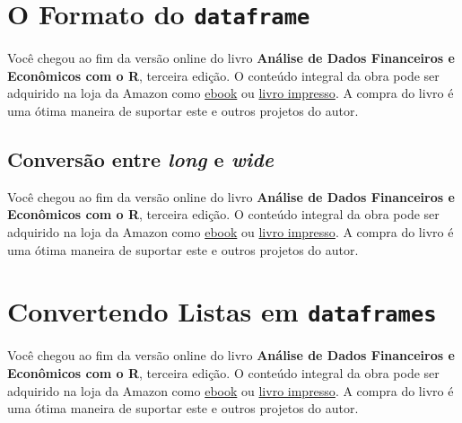 \documentclass[
  11pt,
]{book}
\newenvironment{pleasebuyit}
{\begin{noteblock}
		
	} {\end{noteblock}}
\begin{document}
\hypertarget{o-formato-do-dataframe}{%
\section{\texorpdfstring{O Formato do \texttt{dataframe}}{O Formato do dataframe}}\label{o-formato-do-dataframe}}

\begin{pleasebuyit}
Você chegou ao fim da versão online do livro \textbf{Análise de Dados
Financeiros e Econômicos com o R}, terceira edição. O conteúdo integral
da obra pode ser adquirido na loja da Amazon como
\href{https://www.amazon.com.br/dp/B08WNC27ZY}{ebook} ou
\href{https://www.amazon.com/dp/B08WP8CCDB}{livro impresso}. A compra do
livro é uma ótima maneira de suportar este e outros projetos do autor.
\end{pleasebuyit}

\hypertarget{conversuxe3o-entre-long-e-wide}{%
\subsection{\texorpdfstring{Conversão entre \emph{long} e \emph{wide}}{Conversão entre long e wide}}\label{conversuxe3o-entre-long-e-wide}}

\begin{pleasebuyit}
Você chegou ao fim da versão online do livro \textbf{Análise de Dados
Financeiros e Econômicos com o R}, terceira edição. O conteúdo integral
da obra pode ser adquirido na loja da Amazon como
\href{https://www.amazon.com.br/dp/B08WNC27ZY}{ebook} ou
\href{https://www.amazon.com/dp/B08WP8CCDB}{livro impresso}. A compra do
livro é uma ótima maneira de suportar este e outros projetos do autor.
\end{pleasebuyit}

\hypertarget{convertendo-listas-em-dataframes}{%
\section{\texorpdfstring{Convertendo Listas em \texttt{dataframes}}{Convertendo Listas em dataframes}}\label{convertendo-listas-em-dataframes}}

\begin{pleasebuyit}
Você chegou ao fim da versão online do livro \textbf{Análise de Dados
Financeiros e Econômicos com o R}, terceira edição. O conteúdo integral
da obra pode ser adquirido na loja da Amazon como
\href{https://www.amazon.com.br/dp/B08WNC27ZY}{ebook} ou
\href{https://www.amazon.com/dp/B08WP8CCDB}{livro impresso}. A compra do
livro é uma ótima maneira de suportar este e outros projetos do autor.
\end{pleasebuyit}
\end{document}
